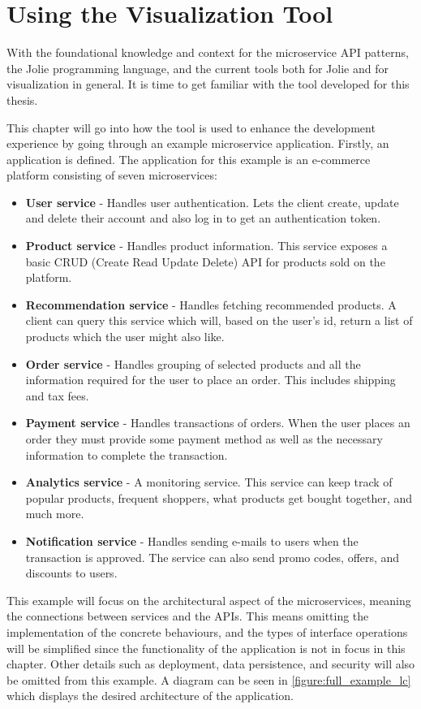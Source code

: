 \chapter{Using the Visualization Tool}
With the foundational knowledge and context for the microservice API patterns, the Jolie programming language, and the current tools both for Jolie and for visualization in general. It is time to get familiar with the tool developed for this thesis.

This chapter will go into how the tool is used to enhance the development experience by going through an example microservice application.
Firstly, an application is defined. The application for this example is an e-commerce platform consisting of seven microservices:

\begin{itemize}
    \item \textbf{User service} - Handles user authentication. Lets the client create, update and delete their account and also log in to get an authentication token.
    \item \textbf{Product service} - Handles product information. This service exposes a basic CRUD (Create Read Update Delete) API for products sold on the platform.
    \item \textbf{Recommendation service} - Handles fetching recommended products. A client can query this service which will, based on the user's id, return a list of products which the user might also like.
    \item \textbf{Order service} - Handles grouping of selected products and all the information required for the user to place an order. This includes shipping and tax fees.
    \item \textbf{Payment service} - Handles transactions of orders. When the user places an order they must provide some payment method as well as the necessary information to complete the transaction.
    \item \textbf{Analytics service} - A monitoring service. This service can keep track of popular products, frequent shoppers, what products get bought together, and much more.
    \item \textbf{Notification service} - Handles sending e-mails to users when the transaction is approved. The service can also send promo codes, offers, and discounts to users.
\end{itemize}
This example will focus on the architectural aspect of the microservices, meaning the connections between services and the APIs.
This means omitting the implementation of the concrete behaviours, and the types of interface operations will be simplified since the functionality of the application is not in focus in this chapter.
Other details such as deployment, data persistence, and security will also be omitted from this example. A diagram can be seen in \cref{figure:full_example_lc} which displays the desired architecture of the application.

